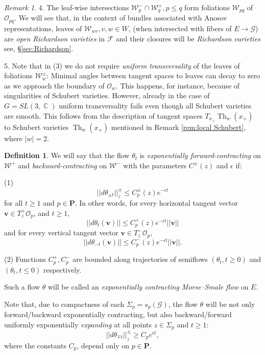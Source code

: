 \documentclass[12pt]{amsbook}%
\theoremstyle{definition}
\newtheorem{defi}[thm]{Definition}
\theoremstyle{remark}
\newtheorem{rem}[thm]{Remark}
\numberwithin{section}{chapter}
\numberwithin{subsection}{section}
\numberwithin{figure}{chapter}
\DeclareMathOperator{\C}{\mathbb{C}}
\DeclareMathOperator{\Th}{Th}
\def\eps{\epsilon}
\def\cF{{\mathscr{F}}}
\def\cO{{\mathscr{O}}}
\def\cW{{\mathscr{W}}}
\def\PP{{\mathbf{P}}}
\def\bv{\mathbf{v}}
\def\cG{{\mathscr{G}}}
\begin{document}
{{\begin{rem}
4. The leaf-wise intersections $\cW^-_p\cap \cW^+_q, p\le q$ form foliations $\cW_{pq}$ of $\cO_{pq}$. 
We will see that, in the context of bundles associated with Anosov representations, 
 leaves of $\cW_{wv}, v, w\in W$, (when intersected with fibers of $E\to \cG$) 
are {\em open Richardson varieties} in $\cF$ and their closures will be {\em Richardson varieties} see, \S \ref{sec:Richardson}. 

5. Note that in (3) we do not require {\em uniform transversality} of the leaves of foliations $\cW_w^\pm$: Minimal angles between tangent spaces to leaves can decay to zero as we approach the boundary of $\cO_w$. This happens, for instance, because of singularities of Schubert varieties. However, already in the case of $G=SL(3,\C)$ uniform transversality fails even though all Schubert varieties are smooth. This follows from the description of tangent 
spaces $T_{x_+}\Th_w(x_+)$ to Schubert varieties $\Th_w(x_+)$ mentioned in Remark \ref{rem:local Schubert}, where $|w|=2$. 
\end{rem}


\begin{defi}
We will say that the flow $\theta_t$ is {\em exponentially forward-contracting} on $\cW^+$ and {\em backward-contracting} on $\cW^-$ with the parameters $C^\pm(z)$ and $\eps$  
if: 

(1)  
$$
||d\theta_{\pm t}||_z^\pm \leqslant C_p^\pm(z) e^{-\eps t} 
$$
for all $t\geqslant 1$ and $p\in \PP$. In other words, for every horizontal  tangent vector $\bv\in T_z^+\cO_p$,  and $t\geqslant 1$, 
$$
||d\theta_t(\bv)||\leqslant C_p^+(z) e^{-\eps t}||\bv||
$$
and for every vertical  tangent vector $\bv\in T_z^-\cO_p$,  
$$
||d\theta_{-t}(\bv)||\leqslant C_p^-(z) e^{-\eps t}||\bv||.
$$

(2) Functions $C_p^+, C_p^-$ are bounded along trajectories of semiflows $(\theta_t, t\geqslant 0)$ and $(\theta_t, t\leqslant 0)$ respectively. 

Such a flow $\theta$ will be called an {\em exponentially contracting Morse--Smale flow} on $E$. 
\end{defi}


Note that, due to compactness of each $\Sigma_p=s_p(\cG)$, the flow $\theta$ will be not only forward/backward exponentially contracting, but also backward/forward uniformly exponentially {\em expanding} at all points $z\in \Sigma_p$ and $t\geqslant 1$:
$$
||d\theta_{\mp t}||_z^\pm \geqslant C_p e^{\eps t}, 
$$
where the constants $C_p$, depend only on $p\in \PP$.  


}}
\end{document}
